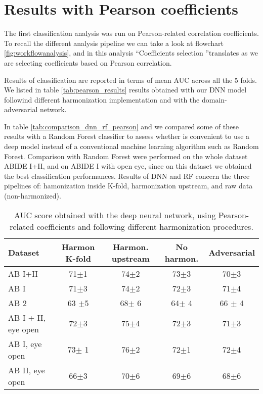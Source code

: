 \documentclass[11pt]{report}
\begin{document}
\section{Results with Pearson coefficients}\label{sec:pearson_results}
The first classification analysis was run on Pearson-related correlation coefficients. To recall the different analysis pipeline we can take a look at flowchart \ref{fig:workflowanalysis}, and in this analysis \textquotedblleft Coefficients selection \textquotedblright  translates as we are selecting coefficients based on Pearson correlation.

Results of classification are reported in terms of mean AUC across all the 5 folds.
We listed in table \ref{tab:pearson_results} results obtained with our DNN model followind different harmonization implementation and with the domain-adversarial network.

In table \ref{tab:comparison_dnn_rf_pearson} and we compared some of these results with a Random Forest classifier to assess whether is convenient to use a deep model instead of a conventional machine learning algorithm such as Random Forest.
Comparison with Random Forest were performed on the whole dataset ABIDE I+II, and on ABIDE I with open eye, since on this dataset we obtained the best classification performances. Results of DNN and RF concern the three pipelines of: hamonization inside K-fold, harmonization upstream, and raw data (non-harmonized).



\begin{table}[!htp]\centering
\scriptsize
\begin{tabular}{lcccc}\toprule
Dataset &Harmon K-fold &Harmon. upstream &No harmon. &Adversarial \\\midrule
AB I+II &71$\pm$1 &74$\pm$2 &73$\pm$3 &70$\pm$3 \\
AB I &71$\pm$3 &74$\pm$2 &72$\pm$3 &71$\pm$4 \\
AB 2 &63 $\pm$5 &68$\pm$ 6 &64$\pm$ 4 &66 $\pm$ 4 \\
AB I + II, eye open &72$\pm$3 &75$\pm$4 &72$\pm$3 &71$\pm$3 \\
AB I, eye open &73$\pm$ 1 &76$\pm$2 &72$\pm$1 &72$\pm$4 \\
AB II, eye open &66$\pm$3 &70$\pm$6 &69$\pm$6 &68$\pm$6 \\
\bottomrule
\end{tabular}
\caption{AUC score obtained with the deep neural network, using Pearson-related coefficients and following different harmonization procedures.}
\label{tab:classification_pearson}
\end{table}
\end{document}
